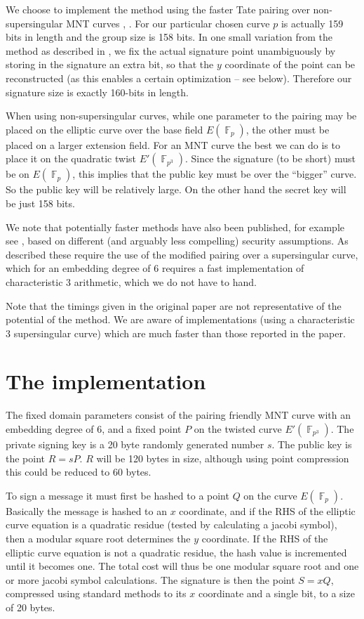 \documentclass{llncs}
\newcommand{\F}{\mathop{\mathbb{F}}}
\begin{document}
We choose to implement the method using the faster Tate pairing over non-supersingular MNT curves 
\cite{miyaji-nakabayashi-takano}, \cite{scott-barreto-1}. For 
our particular chosen 
curve $p$ is actually 159 bits in length and the group size is 158 bits. In one small variation from the method as 
described in \cite{boneh-lynn-shacham}, we fix the actual signature point unambiguously by storing in the 
signature an extra bit, so that the $y$ coordinate of the point can be reconstructed (as this enables a certain 
optimization -- see below). Therefore our signature size is exactly 160-bits in length.

When using non-supersingular curves, while one parameter to the pairing may be placed on the elliptic curve over
the base field $E(\F_p)$, the other must be placed on a larger extension field. For an MNT curve the best we can
do is to place it on the quadratic twist $E'(\F_{p^3})$. Since the signature (to be short) must be on $E(\F_p)$, 
this implies 
that the public key must be over the ``bigger'' curve. So the public key will be relatively large. On the other hand 
the secret key will be just 158 bits.

We note that potentially faster methods have also been published, for example see \cite{zhang-chen-susilo-mu}, 
based on different (and arguably less compelling) security assumptions. As 
described these require the use of the modified pairing over a supersingular curve, which for an embedding degree 
of 6 requires a fast implementation of characteristic 3 arithmetic, which we do not have to hand.

Note that the timings given in the original paper are not representative of the potential of the method. We are 
aware of implementations (using a characteristic 3 supersingular curve) which are much faster than those reported in 
the paper.

\section{The implementation}

The fixed domain parameters consist of the pairing friendly MNT curve with an embedding degree of 6, and a fixed
point $P$ on the twisted curve $E'(\F_{p^3})$. The private signing key is a 20 byte randomly generated number $s$.
The public key is the point $R=sP$. $R$ will be 120 bytes in size, although using point compression this could be
reduced to 60 bytes.

To sign a message it must first be hashed to a point $Q$ on the curve $E(\F_p)$. Basically the message is hashed
to an $x$ coordinate, and if the RHS of the elliptic curve equation is a quadratic residue (tested by calculating 
a jacobi symbol), then a modular square root determines the $y$ coordinate. If the RHS of the elliptic curve equation
is not a quadratic residue, the hash value is incremented until it becomes one. The total cost will thus be one modular 
square root and one or more jacobi symbol calculations. The signature is then the point $S=xQ$, compressed using 
standard methods to its $x$ coordinate and a single bit, to a size of 20 bytes.
\end{document}
